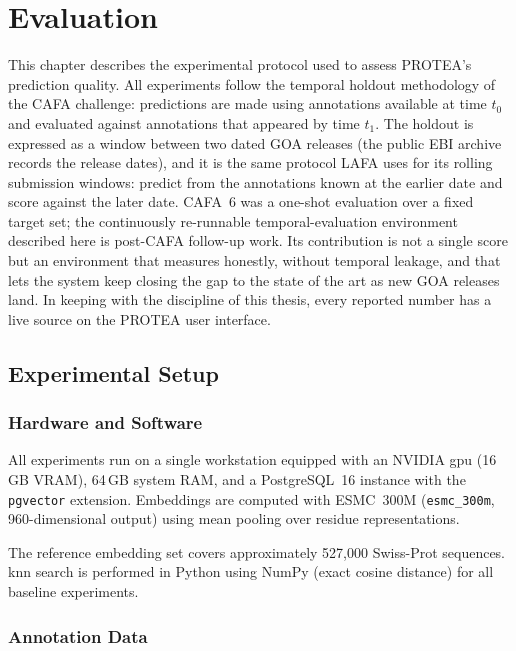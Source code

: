 \chapter{Evaluation}
\label{chap:evaluation}

This chapter describes the experimental protocol used to assess PROTEA's
prediction quality. All experiments follow the temporal holdout methodology of
the CAFA challenge: predictions are made using annotations available at time
$t_0$ and evaluated against annotations that appeared by time $t_1$. The holdout
is expressed as a window between two dated GOA releases (the public EBI archive
records the release dates), and it is the same protocol LAFA uses for its rolling
submission windows: predict from the annotations known at the earlier date and
score against the later date. CAFA~6 was a one-shot evaluation over a fixed
target set; the continuously re-runnable temporal-evaluation environment
described here is post-CAFA follow-up work. Its contribution is not a single
score but an environment that measures honestly, without temporal leakage, and
that lets the system keep closing the gap to the state of the art as new GOA
releases land. In keeping with the discipline of this thesis, every reported
number has a live source on the PROTEA user interface.

\section{Experimental Setup}
\label{sec:eval-setup}

\subsection{Hardware and Software}

All experiments run on a single workstation equipped with an NVIDIA \gls{gpu}
(16\,GB VRAM), 64\,GB system RAM, and a PostgreSQL~16 instance with the
\texttt{pgvector} extension. Embeddings are computed with ESMC~300M
(\texttt{esmc\_300m}, 960-dimensional output) using mean pooling over residue
representations.

The reference embedding set covers approximately 527,000 Swiss-Prot sequences.
\Gls{knn} search is performed in Python using NumPy (exact cosine distance) for
all baseline experiments.

\subsection{Annotation Data}

